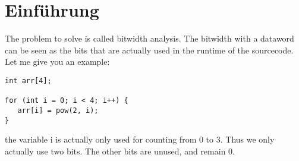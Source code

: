 \chapter{Einführung}\label{sec:intro}


The problem to solve is called bitwidth analysis.
The bitwidth with a dataword can be seen as the bits that are actually used in the runtime of the sourcecode.
Let me give you an example:
\begin{lstlisting}[frame=single]
int arr[4];

for (int i = 0; i < 4; i++) {
   arr[i] = pow(2, i);
}
\end{lstlisting}
the variable i is actually only used for counting from 0 to 3.
Thus we only actually use two bits. The other bits are unused, and remain 0.


